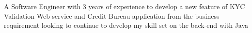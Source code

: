


\begin{cvparagraph}


    A Software Engineer with 3 years of experience to develop a new feature of KYC Validation Web service and Credit Bureau application from the business requirement looking to continue to develop my skill set on the back-end with Java

\end{cvparagraph}
